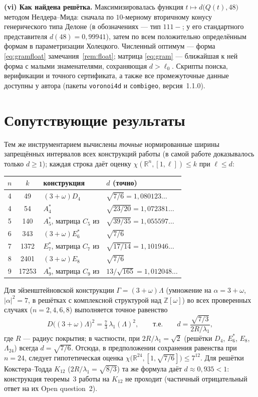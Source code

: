 \documentclass[12pt]{article}
\theoremstyle{definition}
\theoremstyle{remark}
\newcommand{\R}{\mathbb{R}}
\newcommand{\Z}{\mathbb{Z}}
\begin{document}
\textbf{(vi) Как найдена решётка.} Максимизировалась функция
$t\mapsto d\bigl(Q(t),48\bigr)$ методом Нелдера--Мида: сначала по
$10$-мерному вторичному конусу генерического типа Делоне (в обозначениях
\cite{VWZ} --- тип $111{-}$; у его стандартного представителя
$d(48)=0{,}99941$), затем по всем положительно определённым формам в
параметризации Холецкого. Численный оптимум --- форма \eqref{eq:gramfloat}
замечания~\ref{rem:float}; матрица \eqref{eq:gram} --- ближайшая к ней форма с
малыми знаменателями, сохраняющая $d>\ell_0$. Скрипты поиска, верификации и
точного сертификата, а также все промежуточные данные доступны у автора
(пакеты \texttt{voronoi4d} и \texttt{combigeo}, версия~1.1.0).

\section{Сопутствующие результаты}\label{sec:extra}

Тем же инструментарием вычислены \emph{точные} нормированные ширины
запрещённых интервалов всех конструкций работы \cite{ABPR} (в самой работе
доказывалось только $d\ge1$); каждая строка даёт оценку
$\chi(\R^n,[1,\ell])\le k$ при $\ell\le d$:

\begin{center}
\begin{tabular}{c c l l}
\hline
$n$ & $k$ & конструкция & $d$ (точно)\\
\hline
4 & 49  & $(3+\omega)D_4$ & $\sqrt{7/6}=1{,}080123\ldots$\\
4 & 54  & $A_4^*$ & $\sqrt{23/20}=1{,}072381\ldots$\\
5 & 140 & $A_5^*$, матрица $C_5$ из \cite{ABPR} & $\sqrt{39/35}=1{,}055597\ldots$\\
6 & 343 & $(3+\omega)E_6^*$ & $\sqrt{7/6}$\\
7 & 1372& $E_7^*$, матрица $C_7$ из \cite{ABPR} & $\sqrt{17/14}=1{,}101946\ldots$\\
8 & 2401& $(3+\omega)E_8$ & $\sqrt{7/6}$\\
9 & 17253& $A_9^*$, матрица $C_9$ из \cite{ABPR} & $13/\sqrt{165}=1{,}012048\ldots$\\
\hline
\end{tabular}
\end{center}

Для эйзенштейновской конструкции $\Gamma=(3+\omega)\Lambda$ (умножение на
$\alpha=3+\omega$, $|\alpha|^2=7$, в решётках с комплексной структурой над
$\Z[\omega]$) во всех проверенных случаях ($n=2,4,6,8$) выполняется точное
равенство
\[
D\bigl((3+\omega)\Lambda\bigr)^2=\tfrac{7}{3}\,\lambda_1(\Lambda)^2,
\qquad\text{т.е.}\qquad
d=\frac{\sqrt{7/3}}{2R/\lambda_1},
\]
где $R$ --- радиус покрытия; в частности, при $2R/\lambda_1=\sqrt2$ (решётки
$D_4$, $E_6^*$, $E_8$, $\Lambda_{24}$) всегда $d=\sqrt{7/6}$. Отсюда, в
предположении сохранения равенства при $n=24$, следует гипотетическая оценка
$\chi\bigl(\R^{24},[1,\sqrt{7/6}]\bigr)\le 7^{12}$. Для решётки
Кокстера--Тодда $K_{12}$ ($2R/\lambda_1=\sqrt{8/3}$) та же формула даёт
$d\approx0{,}935<1$: конструкция теоремы~3 работы \cite{ABPR} на $K_{12}$ не
проходит (частичный отрицательный ответ на их Open question~2).
\end{document}
